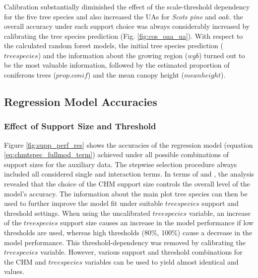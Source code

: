 \subsubsection*{}
Calibration substantially diminished the effect of the scale-threshold dependency for the five tree species and also increased the UAs for \textit{Scots pine} and $oak$.  the overall accuracy under each support choice was always considerably increased by calibrating the tree species prediction (Fig. \ref{fig:cos_oaa_ua}). With respect to the calculated random forest models, the initial tree species prediction ($treespecies$) and the information about the growing region ($wgb$) turned out to be the most valuable information, followed by the estimated proportion of coniferous trees ($prop.conif$) and the mean canopy height ($meanheight$).


\subsection{Regression Model Accuracies}
\label{sec:supp_chm_tspec_res}


\subsubsection*{Effect of Support Size and Threshold}

Figure \ref{fig:supp_perf_res} shows the accuracies of the regression model (equation \ref{eq:chmtspec_fullmod_term}) achieved under all possible combinations of support sizes for the auxiliary data. The stepwise selection procedure always included all considered single and interaction terms. In terms of \adjrsq{} and \rmsecv{}, the analysis revealed that the choice of the CHM support size controls the overall level of the model's accuracy. The information about the main plot tree species can then be used to further improve the model fit under suitable $treespecies$ support and threshold settings. When using the uncalibrated $treespecies$ variable, an increase of the $treespecies$ support size causes an increase in the model performance if low thresholds are used, whereas high thresholds (80\%, 100\%) cause a decrease in the model performance. This threshold-dependency was removed by calibrating the $treespecies$ variable.  However, various support and threshold combinations for the CHM and $treespecies$ variables can be used to yield almost identical \rmsecv{} and \adjrsq{} values.

